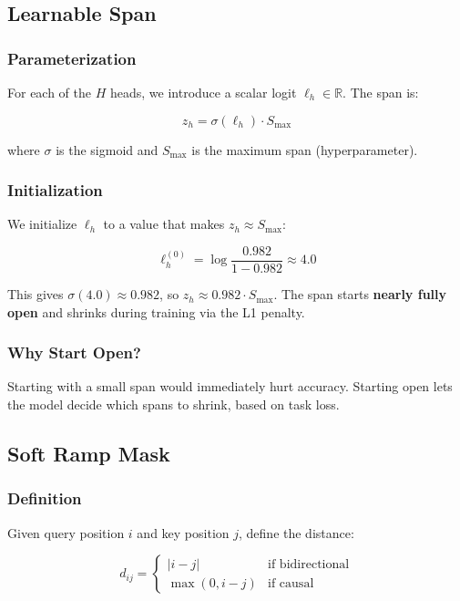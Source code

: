 \subsection{Learnable Span}

\subsubsection{Parameterization}

For each of the $H$ heads, we introduce a scalar logit $\ell_h \in \mathbb{R}$. 
The span is:

\[
z_h = \sigma(\ell_h) \cdot S_\text{max}
\]

where $\sigma$ is the sigmoid and $S_\text{max}$ is the maximum span 
(hyperparameter).

\subsubsection{Initialization}

We initialize $\ell_h$ to a value that makes $z_h \approx S_\text{max}$:

\[
\ell_h^{(0)} = \log \frac{0.982}{1 - 0.982} \approx 4.0
\]

This gives $\sigma(4.0) \approx 0.982$, so $z_h \approx 0.982 \cdot S_\text{max}$. 
The span starts \textbf{nearly fully open} and shrinks during training via the 
L1 penalty.

\subsubsection{Why Start Open?}

Starting with a small span would immediately hurt accuracy. Starting open 
lets the model decide which spans to shrink, based on task loss.

\subsection{Soft Ramp Mask}

\subsubsection{Definition}

Given query position $i$ and key position $j$, define the distance:

\[
d_{ij} = \begin{cases} |i - j| & \text{if bidirectional} \\ \max(0, i - j) & \text{if causal} \end{cases}
\]

